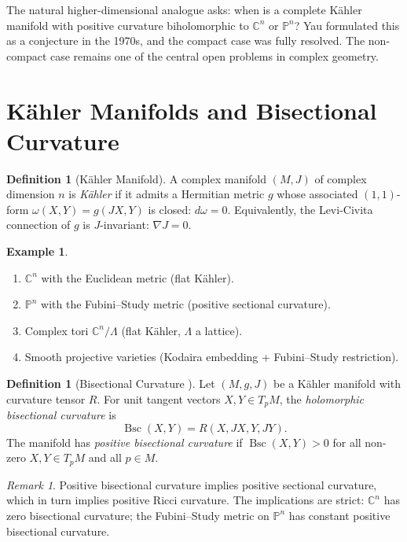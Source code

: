 \documentclass[12pt,a4paper]{amsart}
\theoremstyle{definition}
\newtheorem{definition}[theorem]{Definition}
\newtheorem{example}[theorem]{Example}
\theoremstyle{remark}
\newtheorem{remark}[theorem]{Remark}
\DeclareMathOperator{\Bsc}{Bsc}
\newcommand{\CC}{\mathbb{C}}
\newcommand{\PP}{\mathbb{P}}
\begin{document}
The natural higher-dimensional analogue asks: when is a complete Kähler
manifold with positive curvature biholomorphic to $\CC^n$ or $\PP^n$?
Yau formulated this as a conjecture in the 1970s, and the compact case was
fully resolved.  The non-compact case remains one of the central open
problems in complex geometry.

\section{Kähler Manifolds and Bisectional Curvature}

\begin{definition}[Kähler Manifold]
A complex manifold $(M, J)$ of complex dimension $n$ is \emph{Kähler} if
it admits a Hermitian metric $g$ whose associated $(1,1)$-form
$\omega(X,Y) = g(JX, Y)$ is closed: $d\omega = 0$.  Equivalently, the
Levi-Civita connection of $g$ is $J$-invariant: $\nabla J = 0$.
\end{definition}

\begin{example}
\begin{enumerate}[label=(\roman*)]
  \item $\CC^n$ with the Euclidean metric (flat Kähler).
  \item $\PP^n$ with the Fubini--Study metric (positive sectional curvature).
  \item Complex tori $\CC^n/\Lambda$ (flat Kähler, $\Lambda$ a lattice).
  \item Smooth projective varieties (Kodaira embedding + Fubini--Study restriction).
\end{enumerate}
\end{example}

\begin{definition}[Bisectional Curvature \cite{GoldbergKobayashi1967}]
Let $(M, g, J)$ be a Kähler manifold with curvature tensor $R$.  For unit
tangent vectors $X, Y \in T_p M$, the \emph{holomorphic bisectional curvature}
is
\[
  \Bsc(X,Y) = R(X, JX, Y, JY).
\]
The manifold has \emph{positive bisectional curvature} if
$\Bsc(X,Y) > 0$ for all non-zero $X, Y \in T_p M$ and all $p \in M$.
\end{definition}

\begin{remark}
Positive bisectional curvature implies positive sectional curvature, which
in turn implies positive Ricci curvature.  The implications are strict:
$\CC^n$ has zero bisectional curvature; the Fubini--Study metric on $\PP^n$
has constant positive bisectional curvature.
\end{remark}
\end{document}
